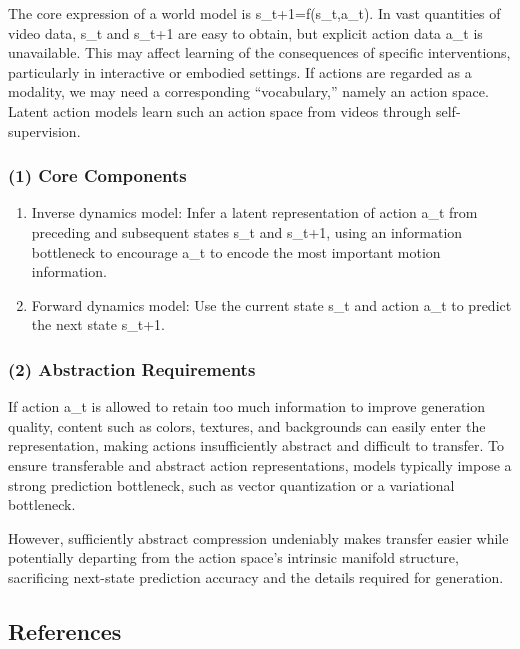 The core expression of a world model is s\_t+1=f(s\_t,a\_t). In vast quantities of video data, s\_t and s\_t+1 are easy to obtain, but explicit action data a\_t is unavailable. This may affect learning of the consequences of specific interventions, particularly in interactive or embodied settings. If actions are regarded as a modality, we may need a corresponding ``vocabulary,'' namely an action space. Latent action models learn such an action space from videos through self-supervision.

\hypertarget{core-components}{%
\subsubsection{(1) Core Components}\label{core-components}}

\begin{enumerate}
\def\labelenumi{\arabic{enumi}.}
\item
  Inverse dynamics model: Infer a latent representation of action a\_t from preceding and subsequent states s\_t and s\_t+1, using an information bottleneck to encourage a\_t to encode the most important motion information.
\item
  Forward dynamics model: Use the current state s\_t and action a\_t to predict the next state s\_t+1.
\end{enumerate}

\hypertarget{abstraction-requirements}{%
\subsubsection{(2) Abstraction Requirements}\label{abstraction-requirements}}

If action a\_t is allowed to retain too much information to improve generation quality, content such as colors, textures, and backgrounds can easily enter the representation, making actions insufficiently abstract and difficult to transfer. To ensure transferable and abstract action representations, models typically impose a strong prediction bottleneck, such as vector quantization or a variational bottleneck.

However, sufficiently abstract compression undeniably makes transfer easier while potentially departing from the action space's intrinsic manifold structure, sacrificing next-state prediction accuracy and the details required for generation.

\FloatBarrier
{}
\hypertarget{references-155}{%
\subsection{References}\label{references-155}}

